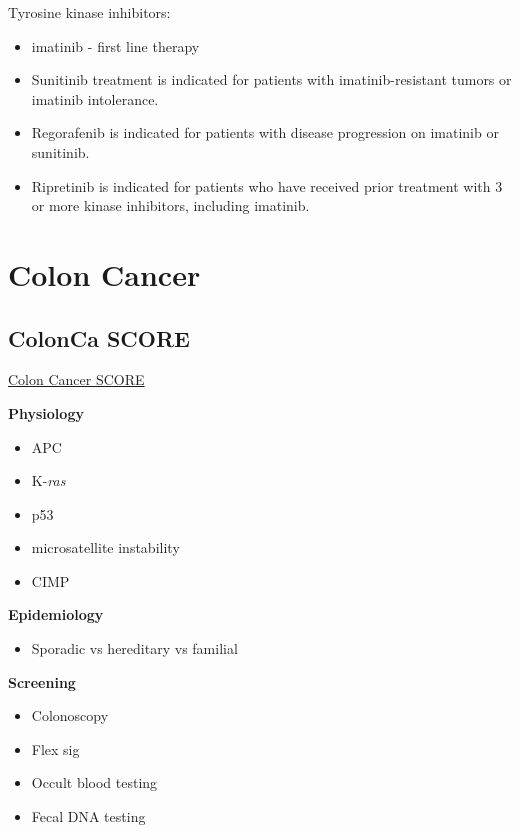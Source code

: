 \documentclass[
]{book}
\providecommand{\tightlist}{%
  \setlength{\itemsep}{0pt}\setlength{\parskip}{0pt}}
\begin{document}
Tyrosine kinase inhibitors:

\begin{itemize}
\tightlist
\item
  imatinib - first line therapy
\item
  Sunitinib treatment is indicated for patients with imatinib-resistant tumors or imatinib intolerance.
\item
  Regorafenib is indicated for patients with disease progression on imatinib or sunitinib.
\item
  Ripretinib is indicated for patients who have received prior treatment with 3 or more kinase inhibitors, including imatinib.
\end{itemize}

\hypertarget{part-colon-cancer}{%
\part*{Colon Cancer}\label{part-colon-cancer}}

\hypertarget{ColonObjCR}{%
\chapter{ColonCa SCORE}\label{ColonObjCR}}

\href{https://www.surgicalcore.org/modulecontent.aspx?id=1000690}{Colon Cancer SCORE}

\textbf{Physiology}

\begin{itemize}
\tightlist
\item
  APC
\item
  K-\emph{ras}
\item
  p53
\item
  microsatellite instability
\item
  CIMP
\end{itemize}

\textbf{Epidemiology}

\begin{itemize}
\tightlist
\item
  Sporadic vs hereditary vs familial
\end{itemize}

\textbf{Screening}

\begin{itemize}
\tightlist
\item
  Colonoscopy
\item
  Flex sig
\item
  Occult blood testing
\item
  Fecal DNA testing
\end{itemize}
\end{document}
